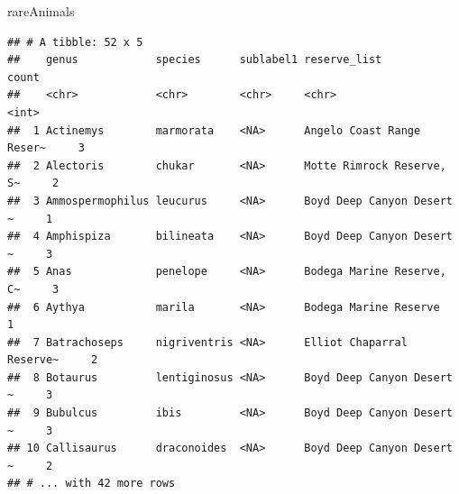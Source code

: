 \documentclass[]{article}
\newenvironment{Shaded}{\begin{snugshade}}{\end{snugshade}}
\newcommand{\NormalTok}[1]{#1}
\begin{document}
\begin{Shaded}
\begin{Highlighting}[]
\NormalTok{rareAnimals}
\end{Highlighting}
\end{Shaded}

\begin{verbatim}
## # A tibble: 52 x 5
##    genus            species      sublabel1 reserve_list              count
##    <chr>            <chr>        <chr>     <chr>                     <int>
##  1 Actinemys        marmorata    <NA>      Angelo Coast Range Reser~     3
##  2 Alectoris        chukar       <NA>      Motte Rimrock Reserve, S~     2
##  3 Ammospermophilus leucurus     <NA>      Boyd Deep Canyon Desert ~     1
##  4 Amphispiza       bilineata    <NA>      Boyd Deep Canyon Desert ~     3
##  5 Anas             penelope     <NA>      Bodega Marine Reserve, C~     3
##  6 Aythya           marila       <NA>      Bodega Marine Reserve         1
##  7 Batrachoseps     nigriventris <NA>      Elliot Chaparral Reserve~     2
##  8 Botaurus         lentiginosus <NA>      Boyd Deep Canyon Desert ~     3
##  9 Bubulcus         ibis         <NA>      Boyd Deep Canyon Desert ~     3
## 10 Callisaurus      draconoides  <NA>      Boyd Deep Canyon Desert ~     2
## # ... with 42 more rows
\end{verbatim}
\end{document}

